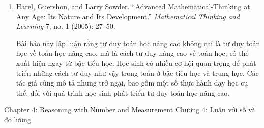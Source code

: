 {{\begin{enumerate}
          \par\noindent\hspace*{1em} Tác giả định nghĩa luận thống kê và thảo luận các nghiên cứu về chủ đề này. Bà cũng mô tả một mô hình phát triển gồm năm giai đoạn luận thống kê của học sinh. Ngoài ra, bà xem xét hàm ý đối với đánh giá và dạy học.\vspace{1.35\baselineskip}

        \item Harel, Guershon, and Larry Sowder. ``Advanced Mathematical-Thinking at Any Age: Its Nature and Its Development.'' \emph{Mathematical Thinking and Learning} 7, no. 1 (2005): 27--50.\vspace{.25\baselineskip}

          \par\noindent\hspace*{1em} Bài báo này lập luận rằng tư duy toán học nâng cao không chỉ là tư duy toán học về toán học nâng cao, mà là cách tư duy nâng cao về toán học, có thể xuất hiện ngay từ bậc tiểu học. Học sinh có nhiều cơ hội quan trọng để phát triển những cách tư duy như vậy trong toán ở bậc tiểu học và trung học. Các tác giả cũng mô tả những trở ngại, bao gồm một số thực hành dạy học cụ thể, đối với quá trình học sinh phát triển tư duy toán học nâng cao.
      \end{enumerate}}
  }{\NOTE{}}

\ParallelSection
  {Chapter 4: Reasoning with Number and Measurement}
  {Chương 4: Luận với số và đo lường}
  {}

